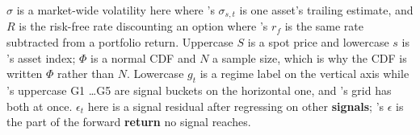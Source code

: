 \begin{note}
$\sigma$ is a market-wide volatility here where 's
$\sigma_{s,t}$ is one asset's trailing estimate, and $R$ is the risk-free rate discounting an option
where 's $r_f$ is the same rate subtracted from a portfolio
return. Uppercase $S$ is a spot price and lowercase $s$ is
's asset index; $\Phi$ is a normal CDF and $N$ a sample size, which
is why the CDF is written $\Phi$ rather than $N$. Lowercase $g_t$ is a regime label on the vertical
axis while 's uppercase G1 \ldots G5 are signal buckets on
the horizontal one, and 's grid has both at once. $\epsilon_t$ here is a
signal residual after regressing on other \textbf{signals};
's $\epsilon$ is the part of the forward \textbf{return} no
signal reaches.
\end{note}
